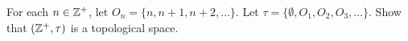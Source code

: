 \begin{comment}
\item $\{\emptyset, \{c\}, \{a,b\}, X\}$

\item $\{\emptyset, \{c\}, \{a,c\}, X\}$

\item $\{\emptyset, \{c\}, \{b,c\}, X\}$

\item $\{\emptyset, \{a\}, \{a,b\}, \{a,c\}, X\}$

\item $\{\emptyset, \{b\}, \{a,b\}, \{b,c\}, X\}$

\item $\{\emptyset, \{c\}, \{a,c\}, \{b,c\}, X\}$

\item $\{\emptyset, \{a\}, \{b\}, \{a,b\}, X\}$

\item $\{\emptyset, \{a\}, \{c\}, \{a,c\}, X\}$

\item $\{\emptyset, \{b\}, \{c\}, \{b,c\}, X\}$

\item $\{\emptyset, \{a\}, \{b\}, \{a,b\}, \{a,c\}, X\}$

\item $\{\emptyset, \{a\}, \{b\}, \{a,b\}, \{b,c\}, X\}$

\item $\{\emptyset, \{a\}, \{c\}, \{a,c\}, \{a,b\}, X\}$

\item $\{\emptyset, \{a\}, \{c\}, \{a,c\}, \{b,c\}, X\}$

\item $\{\emptyset, \{b\}, \{c\}, \{b,c\}, \{a,b\}, X\}$

\item $\{\emptyset, \{b\}, \{c\}, \{b,c\}, \{a,c\}, X\}$

\item discrete topology

\end{enumerate}

\end{multicols}

\ea

\end{comment}


\item For each $n \in \mathbb{Z}^+$, let $O_n = \{n, n+1, n+2, \ldots\}$. Let $\tau = \{\emptyset, O_1, O_2, O_3, \ldots\}$. 
Show that $(\mathbb{Z}^+, \tau)$ is a topological space.

